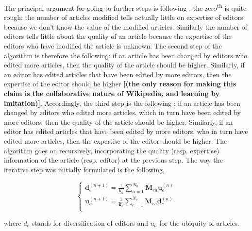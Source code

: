 The principal argument for going to further steps is following : the zero\textsuperscript{th} is quite rough: the number of articles modified tells actually little on expertise of editors because we don't know the value of the modified articles. Similarly the number of editors tells little about the quality of an article because the expertise of the editors who have modified the article is unknown. The second step of the algorithm is therefore the following: if an article has been changed by editors who edited more articles, then the quality of the article should be higher. Similarly, if an editor has edited articles that have been edited by more editors, then the expertise of the editor should be higher {\bf [(the only reason for making this claim is the collaborative nature of Wikipedia, and learning by imitation)]}.  Accordingly, the third step is the following : if an article has been changed by editors who edited more articles, which in turn have been edited by more editors, then the quality of the article should be higher. Similarly, if an editor has edited articles that have been edited by more editors, who in turn have edited more articles, then the expertise of the editor should be higher. The algorithm goes on recursively, incorporating the quality (resp. expertise) information of the article (resp. editor) at the previous step. The way the iterative step was initially formulated is the following, 

\begin{equation}
\begin{cases}
 \mathbf{d}_{e}^{(n+1)} = \frac{1}{\mathbf{k}_a} \sum_{a=1}^{N_{a}} \mathbf{M}_{ea} \mathbf{u}_{a}^{(n)}\\
 \mathbf{u}_{a}^{(n+1)} = \frac{1}{\mathbf{k}_e}\sum_{e=1}^{N_{e}} \mathbf{M}_{ea} \mathbf{d}_{e}^{(n)}\\
\end{cases}
\label{HHalgo}
\end{equation}

where $d_{e}$ stands for diversification of editors and $u_{a}$ for the ubiquity of articles.

